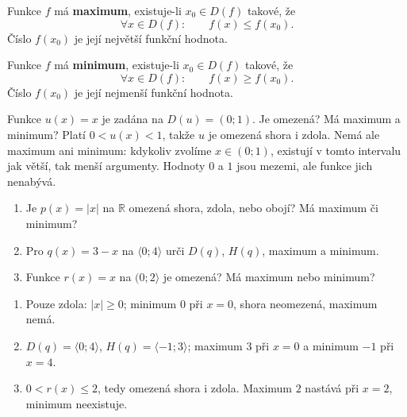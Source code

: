 \documentclass[11pt,a4paper]{article}
\begin{document}
\begin{definiceBox}[title={Definice - Maximum funkce}]
Funkce $f$ má \textbf{maximum}, existuje-li $x_0\in D(f)$ takové, že
\[
\forall x\in D(f):\qquad f(x)\le f(x_0).
\]
Číslo $f(x_0)$ je její největší funkční hodnota.
\end{definiceBox}
\begin{definiceBox}[title={Definice - Minimum funkce}]
Funkce $f$ má \textbf{minimum}, existuje-li $x_0\in D(f)$ takové, že
\[
\forall x\in D(f):\qquad f(x)\ge f(x_0).
\]
Číslo $f(x_0)$ je její nejmenší funkční hodnota.
\end{definiceBox}

\begin{prikladReseniBox}[title={Příklad 4}]
Funkce $u(x)=x$ je zadána na $D(u)=(0;1)$.
Je omezená? Má maximum a minimum?
\tcblower
Platí $0<u(x)<1$, takže $u$ je omezená
shora i zdola. Nemá ale maximum ani minimum:
kdykoliv zvolíme $x\in(0;1)$, existují v tomto intervalu
jak větší, tak menší argumenty. Hodnoty $0$ a $1$
jsou mezemi, ale funkce jich nenabývá.
\end{prikladReseniBox}


\begin{zadaniReseniBox}[title={Samostatná práce 1}]
\begin{enumerate}[label=\alph*)]
\item Je $p(x)=|x|$ na $\mathbb R$ omezená shora,
    zdola, nebo obojí? Má maximum či minimum?
\item Pro $q(x)=3-x$ na $\langle0;4\rangle$ urči
    $D(q)$, $H(q)$, maximum a minimum.
\item Funkce $r(x)=x$ na $(0;2\rangle$ je omezená?
    Má maximum nebo minimum?
\end{enumerate}
\tcblower
\begin{enumerate}[label=\alph*)]
\item Pouze zdola: $|x|\ge0$; minimum $0$ při $x=0$,
    shora neomezená, maximum nemá.
\item $D(q)=\langle0;4\rangle$, $H(q)=\langle-1;3\rangle$;
    maximum $3$ při $x=0$ a minimum $-1$ při $x=4$.
\item $0<r(x)\le2$, tedy omezená shora i zdola.
    Maximum $2$ nastává při $x=2$, minimum neexistuje.
\end{enumerate}
\end{zadaniReseniBox}
\end{document}
